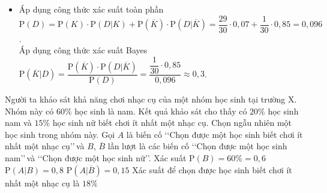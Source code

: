 \begin{ex}
{\begin{itemize}
\begin{center}
			\end{center}
			\item Áp dụng công thức xác suất toàn phần\\
			$\mathrm{P}(D)=\mathrm{P}(K)\cdot \mathrm{P}\left(D|K\right)+\mathrm{P}\left(\overline{K}\right)\cdot \mathrm{P}\left(D|\overline{K}\right)=\dfrac{29}{30}\cdot 0{,}07+\dfrac{1}{30}\cdot 0{,}85=0{,}096$.\\
			Áp dụng công thức xác suất Bayes\\
			$\mathrm{P}\left(\overline{K}|D\right)=\dfrac{\mathrm{P}\left(\overline{K}\right)\cdot \mathrm{P}\left(D|\overline{K}\right)}{\mathrm{P}(D)}=\dfrac{\dfrac{1}{30}\cdot 0{,}85}{0{,}096} \approx 0{,}3$.
		\end{itemize}
	}
\end{ex}

\begin{ex}%
	Người ta khảo sát khả năng chơi nhạc cụ của một nhóm học sinh tại trường X. Nhóm này có $60\%$ học sinh là nam. Kết quả khảo sát cho thấy có $20\%$ học sinh nam và $15\%$ học sinh nữ biết chơi ít nhất một nhạc cụ. Chọn ngẫu nhiên một học sinh trong nhóm này. Gọi $A$ là biến cố \lq\lq Chọn được một học sinh biết chơi ít nhất một nhạc cụ\rq\rq\,và $B$, $\overline{B}$ lần lượt là các biến cố \lq\lq Chọn được một học sinh nam\rq\rq\,và \lq\lq Chọn được một học sinh nữ\rq\rq. 
	\choiceTF
	{\True Xác suất $\mathrm{P}(B) = 60\% = 0{,}6$}
	{$\mathrm{P}(A|B) = 0{,}8$}
	{\True $\mathrm{P}(A|\overline{B}) = 0{,}15$}
	{\True Xác suất để chọn được học sinh biết chơi ít nhất một nhạc cụ là $18\%$}
\end{ex}

